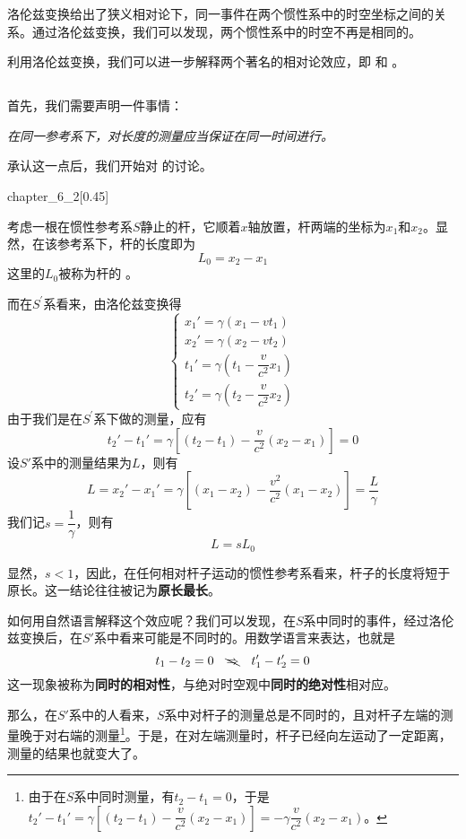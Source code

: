 洛伦兹变换给出了狭义相对论下，同一事件在两个惯性系中的时空坐标之间的关系。通过洛伦兹变换，我们可以发现，两个惯性系中的时空不再是相同的。

利用洛伦兹变换，我们可以进一步解释两个著名的相对论效应，即\linebreak{} 和 。
\subsection[尺缩效应]{}
首先，我们需要声明一件事情：
\begin{center}
	\em 在同一参考系下，对长度的测量应当保证在同一时间进行。
\end{center}
承认这一点后，我们开始对  的讨论。
\begin{singlefigure}{chapter_6_2}[0.45]
\end{singlefigure}
考虑一根在惯性参考系$S$静止的杆，它顺着$x$轴放置，杆两端的坐标为$x_1$和$x_2$。显然，在该参考系下，杆的长度即为$ $
\[L_0=x_2-x_1\]
这里的$L_0$被称为杆的 。

而在$S^{\prime}$系看来，由洛伦兹变换得
\[\left\{\begin{array}{l}
	x_{1}'=\gamma(x_1-vt_1)\\
	x_{2}'=\gamma(x_2-vt_2)\\
	t_1'=\gamma(t_1-\dfrac{v}{c^2} x_1)\\[1ex]
	t_2'=\gamma(t_2-\dfrac{v}{c^2} x_2)
\end{array}\right.\]
由于我们是在$S^{\prime}$系下做的测量，应有
\[t_2'-t_1'=\gamma[(t_2-t_1)-\dfrac{v}{c^2} (x_2-x_1)]=0\]
设$S'$系中的测量结果为$L$，则有
\[L=x_2'-x_1'=\gamma[(x_1-x_2)-\dfrac{v^2}{c^2}(x_1-x_2)]=\dfrac{L}{\gamma}\]
我们记$s=\dfrac{1}{\gamma}$，则有
\begin{equation}
	L=sL_0
\end{equation}

显然，$s<1$，因此，在任何相对杆子运动的惯性参考系看来，杆子的长度将短于原长。这一结论往往被记为\textbf{原长最长}。

如何用自然语言解释这个效应呢？我们可以发现，在$S$系中同时的事件，经过洛伦兹变换后，在$S'$系中看来可能是不同时的。用数学语言来表达，也就是
\[
	t_1-t_2=0\quad \bcancel{\Rightarrow}\quad t_1'-t_2'=0
\]
这一现象被称为\textbf{同时的相对性}，与绝对时空观中\textbf{同时的绝对性}相对应。

那么，在$S'$系中的人看来，$S$系中对杆子的测量总是不同时的，且对杆子左端的测量晚于对右端的测量\footnote{由于在$S$系中同时测量，有$t_2-t_1=0$，于是$t_2'-t_1'=\gamma[(t_2-t_1)-\dfrac{v}{c^2} (x_2-x_1)]=-\gamma \dfrac{v}{c^2} (x_2-x_1)$。}。于是，在对左端测量时，杆子已经向左运动了一定距离，测量的结果也就变大了。

